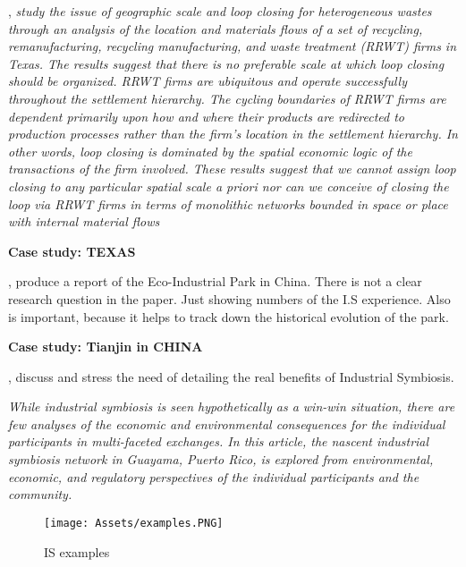 \textbf{}\par
\textcite{Lyons2007}, \textit{study the issue of geographic scale and loop closing for heterogeneous wastes through an analysis of the location and materials flows of a set of recycling, remanufacturing, recycling manufacturing, and waste treatment (RRWT) firms in Texas. The results suggest that there is no preferable scale at which loop closing should be organized. RRWT firms are ubiquitous and operate successfully throughout the settlement hierarchy. The cycling boundaries of RRWT firms are dependent primarily upon how and where their products are redirected to production processes rather than the firm’s location in the settlement hierarchy. In other words, loop closing is dominated by the spatial economic logic of the transactions of the firm involved. These results suggest that we cannot assign loop closing to any particular spatial scale a priori nor can we conceive of closing the loop via RRWT firms in terms of monolithic networks bounded in space or place with internal material flows} \par 

\textbf{Case study: TEXAS}



\textbf{}\par
\textcite{Shi2010}, produce a report of the Eco-Industrial Park in China. There is not a clear research question in the paper. Just showing numbers of the I.S experience. Also is important, because it helps to track down the historical evolution of the park.

\textbf{Case study: Tianjin in CHINA}



\textbf{}\par
\textcite{Lombardi2005}, discuss and stress the need of detailing the real benefits of Industrial Symbiosis. 


\textit{While industrial symbiosis is seen hypothetically as a win-win situation, there are few analyses of the economic and environmental consequences for the individual participants in multi-faceted exchanges. In this article, the nascent industrial symbiosis network in Guayama, Puerto Rico, is explored from environmental, economic, and regulatory perspectives of the individual participants and the community.}


\begin{figure}[h!]
    \centering
    \texttt{[image: Assets/examples.PNG]}
    \caption{IS examples}
    \label{fig:IS examples}
\end{figure}

